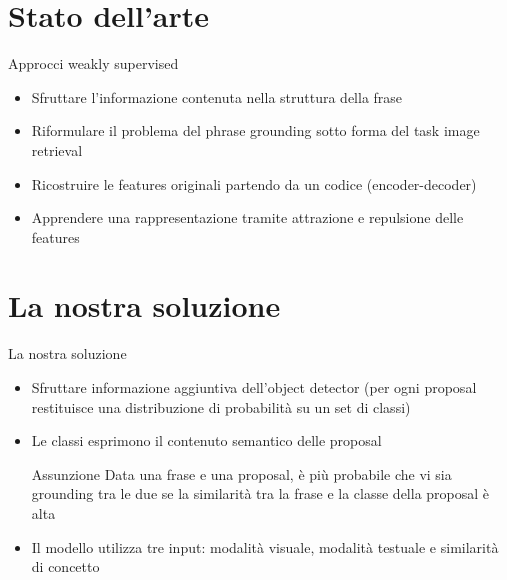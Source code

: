 \documentclass{beamer}
\begin{document}
\section{Stato dell'arte}

\begin{frame}{Approcci weakly supervised}
  \begin{itemize}
    \item Sfruttare l'informazione contenuta nella \alert{struttura
    della frase}
    \item Riformulare il problema del phrase grounding sotto forma del
    task \alert{image retrieval}
    \item \alert{Ricostruire} le features originali partendo da un
    codice (encoder-decoder)
    \item Apprendere una rappresentazione tramite
    \alert{attrazione e repulsione} delle features
  \end{itemize}
\end{frame}

\section{La nostra soluzione}

\begin{frame}{La nostra soluzione}
  \begin{itemize}
    \item Sfruttare informazione aggiuntiva dell'object detector (per
    ogni proposal restituisce una \alert{distribuzione di probabilità}
    su un set di classi)
    \item Le classi esprimono il \alert{contenuto semantico} delle
    proposal
    \vspace{0.5cm}
    \begin{alertblock}{Assunzione}
      Data una frase e una proposal, è più probabile che vi sia
      grounding tra le due se la \alert{similarità} tra la frase e la
      classe della proposal è alta
    \end{alertblock}
    \vspace{0.5cm}
    \item Il modello utilizza \alert{tre input}: modalità visuale,
    modalità testuale e similarità di concetto 
  \end{itemize}
\end{frame}
\end{document}
